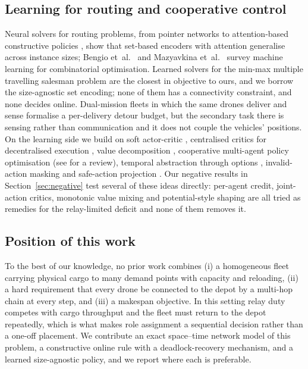\documentclass[final,5p,times,twocolumn]{elsarticle}
\begin{document}
\subsection{Learning for routing and cooperative control}
\label{sec:rel-learning}
Neural solvers for routing problems, from pointer networks \cite{vinyals2015} to
attention-based constructive policies \cite{nazari2018,kool2019}, show that set-based encoders
with attention generalise across instance sizes; Bengio et~al.\ \cite{bengio2021} and
Mazyavkina et~al.\ \cite{mazyavkina2021} survey machine learning for combinatorial optimisation.
Learned solvers for the min-max multiple travelling salesman problem \cite{park2023,guo2024}
are the closest in objective to ours, and we borrow the size-agnostic set encoding; none of them
has a connectivity constraint, and none decides online. Dual-mission fleets in which the same
drones deliver and sense \cite{zhu2026} formalise a per-delivery detour budget, but the secondary
task there is sensing rather than communication and it does not couple the vehicles' positions.
On the learning side we build on soft actor-critic \cite{haarnoja2018}, centralised critics for
decentralised execution \cite{lowe2017,foerster2018}, value decomposition
\cite{sunehag2018,rashid2018}, cooperative multi-agent policy optimisation \cite{yu2022} (see
\cite{oroojlooy2023} for a review), temporal abstraction through options
\cite{sutton1999,bacon2017,vezhnevets2017}, invalid-action masking \cite{huang2022} and
safe-action projection \cite{dalal2018}. Our negative results in Section~\ref{sec:negative} test
several of these ideas directly: per-agent credit, joint-action critics, monotonic value mixing
and potential-style shaping \cite{ng1999} are all tried as remedies for the relay-limited deficit
and none of them removes it.

\subsection{Position of this work}
\label{sec:rel-position}
To the best of our knowledge, no prior work combines (i) a homogeneous fleet carrying physical
cargo to many demand points with capacity and reloading, (ii) a hard requirement that every drone
be connected to the depot by a multi-hop chain at every step, and (iii) a makespan objective.
In this setting relay duty competes with cargo throughput and the fleet must return to the depot
repeatedly, which is what makes role assignment a sequential decision rather than a one-off
placement. We contribute an exact space--time network model of this problem, a constructive
online rule with a deadlock-recovery mechanism, and a learned size-agnostic policy, and we
report where each is preferable.
\end{document}
